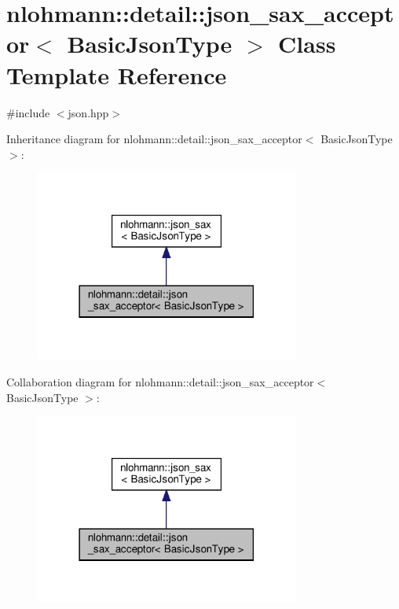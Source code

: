 \hypertarget{classnlohmann_1_1detail_1_1json__sax__acceptor}{}\section{nlohmann\+:\+:detail\+:\+:json\+\_\+sax\+\_\+acceptor$<$ Basic\+Json\+Type $>$ Class Template Reference}
\label{classnlohmann_1_1detail_1_1json__sax__acceptor}


{\ttfamily \#include $<$json.\+hpp$>$}



Inheritance diagram for nlohmann\+:\+:detail\+:\+:json\+\_\+sax\+\_\+acceptor$<$ Basic\+Json\+Type $>$\+:
\nopagebreak
\begin{figure}[H]
\begin{center}
\leavevmode
\includegraphics[width=246pt]{classnlohmann_1_1detail_1_1json__sax__acceptor__inherit__graph}
\end{center}
\end{figure}


Collaboration diagram for nlohmann\+:\+:detail\+:\+:json\+\_\+sax\+\_\+acceptor$<$ Basic\+Json\+Type $>$\+:
\nopagebreak
\begin{figure}[H]
\begin{center}
\leavevmode
\includegraphics[width=246pt]{classnlohmann_1_1detail_1_1json__sax__acceptor__coll__graph}
\end{center}
\end{figure}
